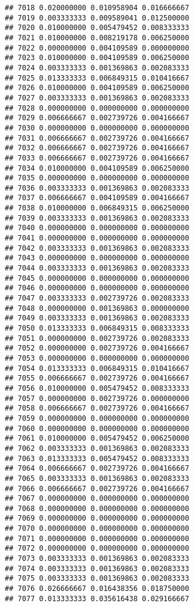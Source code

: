 \documentclass[
]{article}
\begin{document}
\begin{verbatim}
## 7018 0.020000000 0.010958904 0.016666667
## 7019 0.003333333 0.009589041 0.012500000
## 7020 0.010000000 0.005479452 0.008333333
## 7021 0.010000000 0.008219178 0.006250000
## 7022 0.000000000 0.004109589 0.000000000
## 7023 0.010000000 0.004109589 0.006250000
## 7024 0.003333333 0.001369863 0.002083333
## 7025 0.013333333 0.006849315 0.010416667
## 7026 0.010000000 0.004109589 0.006250000
## 7027 0.003333333 0.001369863 0.002083333
## 7028 0.000000000 0.000000000 0.000000000
## 7029 0.006666667 0.002739726 0.004166667
## 7030 0.000000000 0.000000000 0.000000000
## 7031 0.006666667 0.002739726 0.004166667
## 7032 0.006666667 0.002739726 0.004166667
## 7033 0.006666667 0.002739726 0.004166667
## 7034 0.010000000 0.004109589 0.006250000
## 7035 0.000000000 0.000000000 0.000000000
## 7036 0.003333333 0.001369863 0.002083333
## 7037 0.006666667 0.004109589 0.004166667
## 7038 0.010000000 0.006849315 0.006250000
## 7039 0.003333333 0.001369863 0.002083333
## 7040 0.000000000 0.000000000 0.000000000
## 7041 0.000000000 0.000000000 0.000000000
## 7042 0.003333333 0.001369863 0.002083333
## 7043 0.000000000 0.000000000 0.000000000
## 7044 0.003333333 0.001369863 0.002083333
## 7045 0.000000000 0.000000000 0.000000000
## 7046 0.000000000 0.000000000 0.000000000
## 7047 0.003333333 0.002739726 0.002083333
## 7048 0.000000000 0.001369863 0.000000000
## 7049 0.003333333 0.001369863 0.002083333
## 7050 0.013333333 0.006849315 0.008333333
## 7051 0.000000000 0.002739726 0.002083333
## 7052 0.000000000 0.002739726 0.004166667
## 7053 0.000000000 0.000000000 0.000000000
## 7054 0.013333333 0.006849315 0.010416667
## 7055 0.006666667 0.002739726 0.004166667
## 7056 0.010000000 0.005479452 0.008333333
## 7057 0.000000000 0.002739726 0.000000000
## 7058 0.006666667 0.002739726 0.004166667
## 7059 0.000000000 0.000000000 0.000000000
## 7060 0.000000000 0.000000000 0.000000000
## 7061 0.010000000 0.005479452 0.006250000
## 7062 0.003333333 0.001369863 0.002083333
## 7063 0.013333333 0.005479452 0.008333333
## 7064 0.006666667 0.002739726 0.004166667
## 7065 0.003333333 0.001369863 0.002083333
## 7066 0.006666667 0.002739726 0.004166667
## 7067 0.000000000 0.000000000 0.000000000
## 7068 0.000000000 0.000000000 0.000000000
## 7069 0.000000000 0.000000000 0.000000000
## 7070 0.000000000 0.000000000 0.000000000
## 7071 0.000000000 0.000000000 0.000000000
## 7072 0.000000000 0.000000000 0.000000000
## 7073 0.003333333 0.001369863 0.002083333
## 7074 0.003333333 0.001369863 0.002083333
## 7075 0.003333333 0.001369863 0.002083333
## 7076 0.026666667 0.016438356 0.018750000
## 7077 0.013333333 0.035616438 0.029166667

\end{verbatim}
\end{document}
